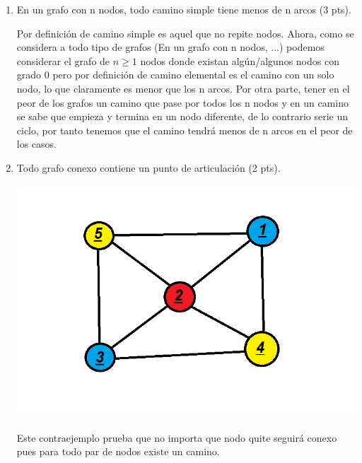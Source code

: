 \documentclass[a4paper,12pt]{article}
\begin{document}
\begin{enumerate}
\item En un grafo con n nodos, todo camino simple tiene menos de n arcos (3 pts).

\begin{flushleft}
Por definición de camino simple es aquel que no repite nodos. Ahora, como se considera a todo tipo de grafos (En un grafo con n nodos, ...) podemos considerar el grafo de $n \geq 1$ nodos donde existan algún/algunos nodos con grado 0 pero por definición de camino elemental es el camino con un solo nodo, lo que claramente es menor que los n arcos. Por otra parte, tener en el peor de los grafos un camino que pase por todos los n nodos y en un camino se sabe que empieza y termina en un nodo diferente, de lo contrario serie un ciclo, por tanto tenemos que el camino tendrá menos de n arcos en el peor de los casos.

\end{flushleft}

\item Todo grafo conexo contiene un punto de articulación (2 pts).

\begin{flushleft}

\begin{center}
\par \includegraphics[scale=0.8]{p6} \par
\end{center}

Este contraejemplo prueba que no importa que nodo quite seguirá conexo pues para todo par de nodos existe un camino. \\

\end{flushleft}


\end{enumerate}
\end{document}
